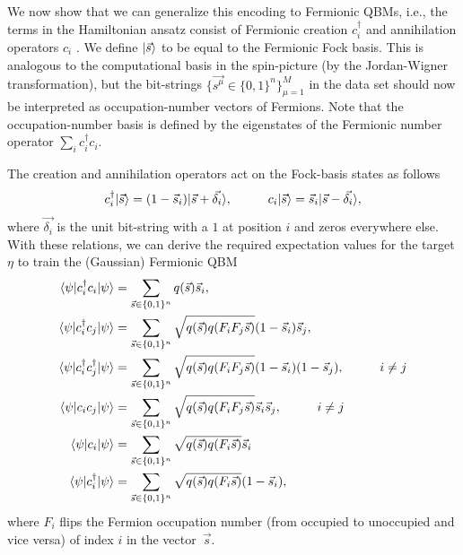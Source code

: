\documentclass[
    aps,
    prx,
    floatfix,
    nofootinbib,
    onecolumn
]{revtex4-2}
\DeclarePairedDelimiter\bra{\langle}{\rvert}
\DeclarePairedDelimiter\ket{\lvert}{\rangle}
\begin{document}
We now show that we can generalize this encoding to Fermionic QBMs, i.e., the terms in the Hamiltonian ansatz consist of Fermionic creation $c_i^\dagger$ and annihilation operators $c_i$ . We define $\ket{\vec{s}}$ to be equal to the Fermionic Fock basis. This is analogous to the computational basis in the spin-picture (by the Jordan-Wigner transformation), but the bit-strings $\{\vec{s^\mu}\in\{0,1\}^n\}_{\mu=1}^M$ in the data set should now be interpreted as occupation-number vectors of Fermions. Note that the occupation-number basis is defined by the eigenstates of the Fermionic number operator $\sum_i c^\dagger_i c_i$. 

The creation and annihilation operators act on the Fock-basis states as follows \begin{equation} 
    c^\dagger_i \ket{\vec{s}} = (1-\vec{s}_i)\ket{\vec{s}+\vec{\delta_i}}, \hspace{1cm} c_i \ket{\vec{s}} = \vec{s}_i\ket{\vec{s}-\vec{\delta_i}},
\end{equation} where $\vec{\delta_i}$ is the unit bit-string with a $1$ at position $i$ and zeros everywhere else. With these relations, we can derive the required expectation values for the target $\eta$ to train the (Gaussian) Fermionic QBM   
\begin{align}
\begin{split}
    \bra{\psi} c^\dagger_i c_i \ket{\psi} &= \sum_{\vec{s}\in\{0,1\}^n}q(\vec{s})\vec{s}_i, \\
    \bra{\psi} c^\dagger_i c_j \ket{\psi} &= \sum_{\vec{s}\in\{0,1\}^n}\sqrt{q(\vec{s})q(F_i F_j\vec{s})}(1-\vec{s}_i)\vec{s}_j,
    \\
    \bra{\psi} c^\dagger_i c^\dagger_j \ket{\psi} &= \sum_{\vec{s}\in\{0,1\}^n}\sqrt{q(\vec{s})q(F_i F_j\vec{s})}(1-\vec{s}_i)(1-\vec{s}_j), \hspace{1cm} i\neq j
    \\
    \bra{\psi} c_i c_j \ket{\psi} &= \sum_{\vec{s}\in\{0,1\}^n}\sqrt{q(\vec{s})q(F_i F_j\vec{s})}\vec{s}_i\vec{s}_j, \hspace{1cm} i\neq j
    \\
    \bra{\psi} c_i\ket{\psi} &= \sum_{\vec{s}\in\{0,1\}^n}\sqrt{q(\vec{s})q(F_i \vec{s})}\vec{s}_i
    \\
    \bra{\psi} c_i^\dagger\ket{\psi} &= \sum_{\vec{s}\in\{0,1\}^n}\sqrt{q(\vec{s})q(F_i \vec{s})}(1-\vec{s}_i),
\end{split}
\end{align} 
where $F_i$ flips the Fermion occupation number (from occupied to unoccupied and vice versa) of index $i$ in the vector~$\vec{s}$. 
\end{document}
